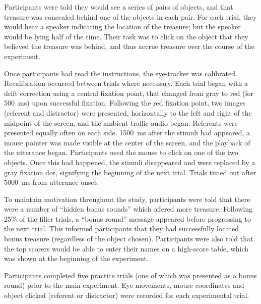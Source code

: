 \documentclass[a4paper,man,natbib]{apa6}
\begin{document}
Participants were told they would see a series of pairs of objects, and that treasure was concealed behind one of the objects in each pair.
For each trial, they would hear a speaker indicating the location of the treasure; but the speaker would be lying half of the time.
Their task was to click on the object that they believed the treasure was behind, and thus accrue treasure over the course of the experiment.

Once participants had read the instructions, the eye-tracker was calibrated.
Recalibration occurred between trials where necessary.
Each trial began with a drift correction using a central fixation point, that changed from gray to red (for 500~ms) upon successful fixation. 
Following the red fixation point, two images (referent and distractor) were presented, horizontally to the left and right of the midpoint of the screen, and the ambient traffic audio began.
Referents were presented equally often on each side.
1500~ms after the stimuli had appeared, a mouse pointer was made visible at the center of the screen, and the playback of the utterance began.
Participants used the mouse to click on one of the two objects.
Once this had happened, the stimuli disappeared and were replaced by a gray fixation dot, signifying the beginning of the next trial. 
Trials timed out after 5000~ms from utterance onset.


To maintain motivation throughout the study, participants were told that there were a number of ``hidden bonus rounds'' which offered more treasure. 
Following 25\% of the filler trials, a ``bonus round'' message appeared before progressing to the next trial.
This informed participants that they had successfully located bonus treasure (regardless of the object chosen).
Participants were also told that the top scorers would be able to enter their names on a high-score table, which was shown at the beginning of the experiment. 

Participants completed five practice trials (one of which was presented as a bonus round) prior to the main experiment. 
Eye movements, mouse coordinates and object clicked (referent or distractor) were recorded for each experimental trial.
\end{document}
